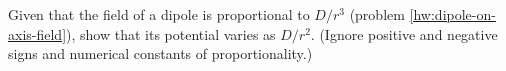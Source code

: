 Given that the field of a dipole is proportional to
$D/r^3$ (problem \ref{hw:dipole-on-axis-field}), show that its potential varies
as $D/r^2$. (Ignore positive and negative signs and
numerical constants of proportionality.)
